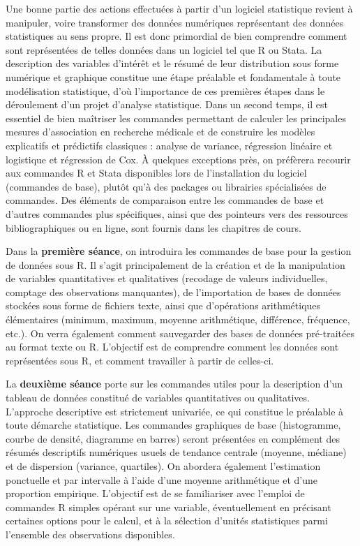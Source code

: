 \documentclass[11pt]{report}
\theoremstyle{definition}
\newcommand{\R}{\textsf{R}\xspace}
\newcommand{\Stata}{\textsf{Stata}\xspace}
\begin{document}
Une bonne partie des actions effectuées à partir d'un logiciel statistique
revient à manipuler, voire transformer des données numériques représentant
des données statistiques au sens propre. Il est donc primordial de bien
comprendre comment sont représentées de telles données dans un logiciel tel
que \R ou \Stata. La description des variables d'intérêt et le résumé de leur
distribution sous forme numérique et graphique constitue une étape préalable
et fondamentale à toute modélisation statistique, d'où l'importance de ces
premières étapes dans le déroulement d'un projet d'analyse statistique. Dans
un second temps, il est essentiel de bien maîtriser les commandes permettant
de calculer les principales mesures d'association en recherche médicale et
de construire les modèles explicatifs et prédictifs classiques : analyse de
variance, régression linéaire et logistique et régression de Cox. À quelques
exceptions près, on préfèrera recourir aux commandes \R et \Stata disponibles
lors de l'installation du logiciel (commandes de base), plutôt qu'à des
packages ou librairies spécialisées de commandes. Des éléments de
comparaison entre les commandes de base et d'autres commandes plus
spécifiques, ainsi que des pointeurs vers des ressources bibliographiques ou
en ligne, sont fournis dans les chapitres de cours.

Dans la \textbf{première séance}, on introduira les commandes de base pour
la gestion de données sous \R. Il s'agit principalement de la création et de
la manipulation de variables quantitatives et qualitatives (recodage de
valeurs individuelles, comptage des observations manquantes), de
l'importation de bases de données stockées sous forme de fichiers texte,
ainsi que d'opérations arithmétiques élémentaires (minimum, maximum, moyenne
arithmétique, différence, fréquence, etc.). On verra également comment
sauvegarder des bases de données pré-traitées au format texte ou
\R. L'objectif est de comprendre comment les données sont représentées sous
\R, et comment travailler à partir de celles-ci.

La \textbf{deuxième séance} porte sur les commandes utiles pour la
description d'un tableau de données constitué de variables quantitatives ou
qualitatives. L'approche descriptive est strictement univariée, ce qui
constitue le préalable à toute démarche statistique. Les commandes
graphiques de base (histogramme, courbe de densité, diagramme en barres)
seront présentées en complément des résumés descriptifs numériques usuels de
tendance centrale (moyenne, médiane) et de dispersion (variance,
quartiles). On abordera également l'estimation ponctuelle et par intervalle
à l'aide d'une moyenne arithmétique et d'une proportion empirique.
L'objectif est de se familiariser avec l'emploi de commandes \R simples
opérant sur une variable, éventuellement en précisant certaines options pour
le calcul, et à la sélection d'unités statistiques parmi l'ensemble des
observations disponibles.
\end{document}
